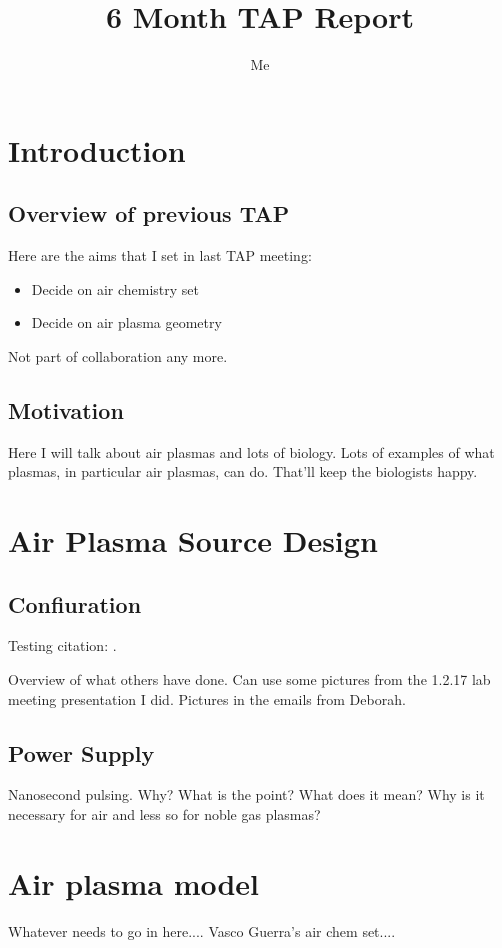 \documentclass[11pt, oneside]{article}   	%
\title{6 Month TAP Report}
\author{Me}
\begin{document}
\maketitle
\section{Introduction}
\subsection{Overview of previous TAP}
Here are the aims that I set in last TAP meeting:
\begin{itemize}
\item Decide on air chemistry set
\item Decide on air plasma geometry
\end{itemize}

Not part of collaboration any more.

\subsection{Motivation}
Here I will talk about air plasmas and lots of biology. 
Lots of examples of what plasmas, in particular air plasmas, can do. 
That'll keep the biologists happy.


\section{Air Plasma Source Design}
\subsection{Confiuration}
Testing citation: \cite{Kolb2008cold}.

Overview of what others have done. Can use some pictures from the 1.2.17 lab meeting presentation I did.
Pictures in the emails from Deborah.

\subsection{Power Supply}
Nanosecond pulsing.
Why? What is the point? What does it mean? Why is it necessary for air and less so for noble gas plasmas?

\section{Air plasma model}
Whatever needs to go in here.... Vasco Guerra's air chem set....



\end{document}
